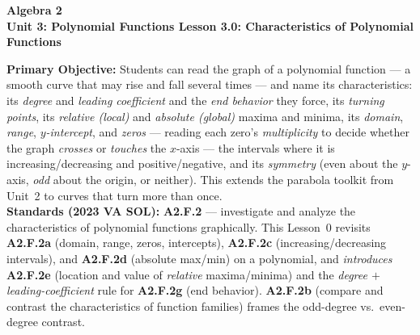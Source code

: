 \documentclass[10pt]{article}
\newcommand{\CourseName}{Algebra 2}
\newcommand{\UnitNumberName}{Unit 3: Polynomial Functions \quad}
\newcommand{\LessonNumberName}{Lesson 3.0: Characteristics of Polynomial Functions}
\begin{document}
\begin{center}
    {\Large\bfseries \CourseName \\
    {\small\bfseries \UnitNumberName \LessonNumberName}}
\end{center}

\begin{tcolorbox}[colback=forestbg, colframe=forest, boxrule=0.9pt, arc=2mm,
    left=2mm, right=2mm, top=1.5mm, bottom=1.5mm]
    \textbf{Primary Objective:} Students can read the graph of a polynomial function --- a smooth
    curve that may rise and fall several times --- and name its characteristics: its \emph{degree}
    and \emph{leading coefficient} and the \emph{end behavior} they force, its \emph{turning
    points}, its \emph{relative (local)} and \emph{absolute (global)} maxima and minima, its
    \emph{domain}, \emph{range}, \emph{$y$-intercept}, and \emph{zeros} --- reading each zero's
    \emph{multiplicity} to decide whether the graph \emph{crosses} or \emph{touches} the $x$-axis
    --- the intervals where it is increasing/decreasing and positive/negative, and its
    \emph{symmetry} (even about the $y$-axis, \emph{odd} about the origin, or neither). This extends
    the parabola toolkit from Unit~2 to curves that turn more than once.
    \\[2pt]
    \textbf{Standards (2023 VA SOL):} \textbf{A2.F.2} --- investigate and analyze the
    characteristics of polynomial functions graphically. This Lesson~0 revisits \textbf{A2.F.2a}
    (domain, range, zeros, intercepts), \textbf{A2.F.2c} (increasing/decreasing intervals), and
    \textbf{A2.F.2d} (absolute max/min) on a polynomial, and \emph{introduces} \textbf{A2.F.2e}
    (location and value of \emph{relative} maxima/minima) and the \emph{degree $+$
    leading-coefficient} rule for \textbf{A2.F.2g} (end behavior). \textbf{A2.F.2b} (compare and
    contrast the characteristics of function families) frames the odd-degree vs.\ even-degree
    contrast.
\end{tcolorbox}
\end{document}

